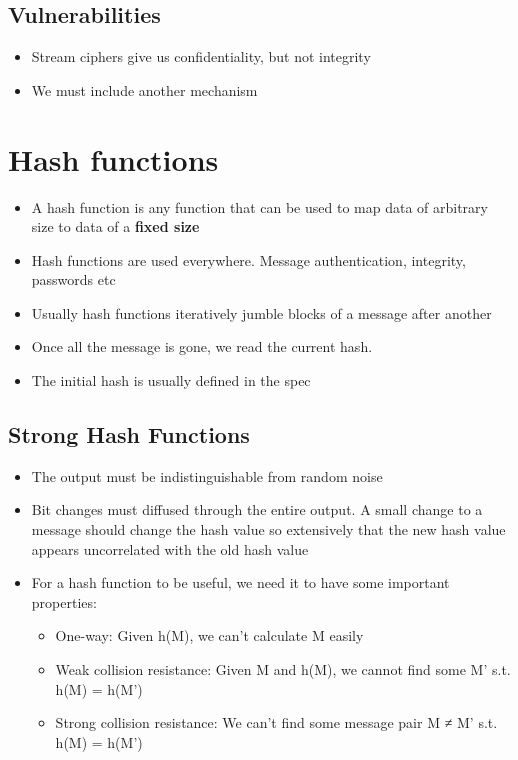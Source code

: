 \documentclass{article}
\begin{document}
\subsection{Vulnerabilities}
\begin{itemize}
  \item Stream ciphers give us confidentiality, but not integrity 
  \item We must include another mechanism
\end{itemize}

\section{Hash functions}
\begin{itemize}
  \item A hash function is any function that can be used to map data of arbitrary size to data of a \textbf{fixed size}
  \item Hash functions are used everywhere. Message authentication, integrity, passwords etc
  \item Usually hash functions iteratively jumble blocks of a message after another 
  \item Once all the message is gone, we read the current hash. 
  \item The initial hash is usually defined in the spec
\end{itemize}

\subsection{Strong Hash Functions}
\begin{itemize}
  \item The output must be indistinguishable from random noise 
  \item Bit changes must diffused through the entire output. A small change to a message should change the hash value so extensively that the new hash value appears uncorrelated with the old hash value
  \item For a hash function to be useful, we need it to have some important properties:
  \begin{itemize}
    \item One-way: Given h(M), we can’t calculate M easily
    \item Weak collision resistance: Given M and h(M), we cannot find some M’ s.t. h(M) = h(M’)
    \item Strong collision resistance: We can’t find some message pair M ≠ M’ s.t. h(M) = h(M’)
  \end{itemize}
\end{itemize}
\end{document}
